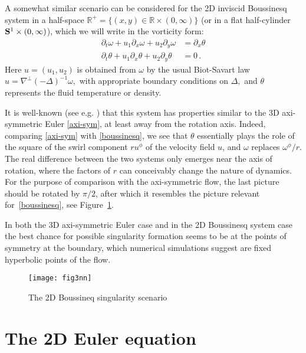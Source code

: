 \documentclass[reqno,centertags, 11pt]{amsart}
\def \Rm {\mathbb R}
\newcommand{\om}{\omega}
\begin{document}
A somewhat similar scenario can be considered for the 2D inviscid Boussinesq system in a half-space $\Rm^+=\{(x,y)\in\Rm\times (0,\infty)\}$ (or in a flat half-cylinder ${\bf S}^1\times (0,\infty)$),
which we will write in the vorticity form:
\begin{subequations}\label{boussinesq}
\begin{align}
\partial_t \om+u_1 \partial_x \om +u_2 \partial_y \om & = \partial_x \theta\\
\partial_t \theta+u_1 \partial_x \theta + u_2 \partial_y \theta & = 0\,.
\end{align}
\end{subequations}
 Here $u=(u_1,u_2)$ is obtained from $\omega$ by the usual Biot-Savart law $u = \nabla^\perp (-\Delta)^{-1}\omega,$ with appropriate boundary
 conditions on $\Delta,$
and $\theta$ represents the fluid temperature or density.

It is well-known (see e.g. \cite{MB}) that this system has properties similar to the 3D axi-symmetric Euler \eqref{axi-sym},
at least away from the rotation axis. Indeed, comparing \eqref{axi-sym} with \eqref{boussinesq}, we see that
$\theta$ essentially plays the role of the square of the swirl
component $r u^\phi$ of the velocity field $u$, and $\omega$ replaces $\omega^\phi/r.$
The real difference between the two systems only emerges near the axis of rotation, where the factors of $r$ can conceivably
change the nature of dynamics.
For the purpose of comparison with the axi-symmetric flow, the last picture should be rotated
by $\pi/2$, after which it resembles the picture relevant for~\eqref{boussinesq}, see Figure~\ref{Bousfig}.


In both the 3D axi-symmetric Euler case and in the 2D Boussinesq system case the best chance for possible singularity formation
seems to be at the points of symmetry at the boundary,
which numerical simulations suggest are fixed hyperbolic points of the flow.

\begin{figure}\label{Bousfig}
\begin{center}
\texttt{[image: fig3nn]}
\caption{The 2D Boussineq singularity scenario}
\end{center}
\end{figure}


\section{The 2D Euler equation}\label{doubleexp}
\end{document}
